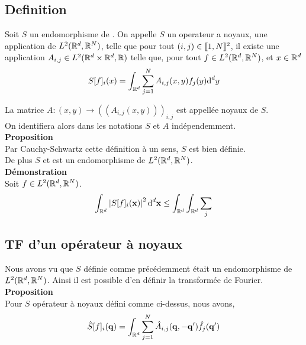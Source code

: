 \documentclass[10pt]{article}
\begin{document}
\subsection{Definition}

Soit $S$ un endomorphisme de . On appelle $S$ un operateur a noyaux, une application de $L^2(\mathbb{R}^d, \mathbb{R}^N)$, telle que pour tout $(i,j) \in  \llbracket 1,N \rrbracket ^2$, il existe une application $A_{i,j} \in L^2(\mathbb{R}^d\times\mathbb{R}^d, \mathbb{R})$ telle que,  pour tout $f \in L^2(\mathbb{R}^d, \mathbb{R}^N)$, et $x \in \mathbb{R}^d$ 
 \begin{equation}
  S[f]_i(x) = \int_{\mathbb{R}^d} \sum_{j=1}^{N} A_{i,j}(x,y)f_j(y) \text{d}^d y
 \end{equation}

 La matrice $A : (x,y) \rightarrow ((A_{i,j}(x,y)))_{i,j}$ est appellée noyaux de $S$. \\
 On identifiera alors dans les notations $S$ et $A$ indépendemment. \\

\textbf{Proposition}\\
Par Cauchy-Schwartz cette définition à un sens, $S$ est bien définie. \\
De plus $S$ et est un endomorphisme de $L^2(\mathbb{R}^d, \mathbb{R}^N)$. \\

\textbf{Démonstration}\\
Soit $f\in L^2(\mathbb{R}^d, \mathbb{R}^N)$.\\

\begin{equation}
   \int_{\mathbb{R}^d} \left| S[f]_i ({\bf x}) \right|^{2} \text{d}^d {\bf x} \le \int_{\mathbb{R}^d} \int_{\mathbb{R}^d} \sum_j 
\end{equation}


\vspace*{11pt}

\subsection{TF d'un opérateur à noyaux}

Nous avons vu que $S$ définie comme précédemment était un endomorphisme de $L^2(\mathbb{R}^d, \mathbb{R}^N)$. Ainsi il est possible d'en définir la transformée de Fourier. \\

\textbf{Proposition}\\
Pour $S$ opérateur à noyaux défini comme ci-dessus, nous avons,
\begin{equation}
  \hat{S}[f]_i({\bf q}) = \int_{\mathbb{R}^d} \sum_{j=1}^{N} \hat{A}_{i,j}({\bf q}, -{\bf q}') \hat{f}_j({\bf q}')
\end{equation}
\end{document}
